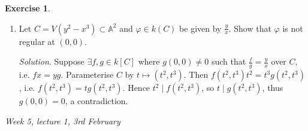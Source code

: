 \documentclass{article}
\newcommand{\A}{\mathbb{A}}
\theoremstyle{definition}
\newtheorem{exe}[defn]{Exercise}
\begin{document}
\begin{exe}
\begin{enumerate}
\textit{Solution}. \begin{enumerate}
\item $V=V(x)\cup V(y)$ and $W=V(y)\cup V(y-x^2)$. One is two axes and the other is $x$-axis with the parabola $y=x^2$, so both are two lines with an intersection at $(0,0)$, hence intuitively they should be isomorphic?
\item $(0,0)$.
\item $W$ is affine, so $f$ is regular if $\exists F\in k[x,y]:F(x,y)=f(x,y) \ \forall (x,y)\in W$. In particular, $y\neq 0$ means $(x,y)\in V(y-x^2)$, so we want $F(x,0)=x^2$ and $F(x,x^2)=0$. Clearly $F(x,y)=x^2-y$ works.
\item By the same analysis, we want $F\in k[x,y]$ with $F(x,0)=x,\ F(x,x^2)=0$. Then write $F(x,y)=x+yG(x,y)$, so $F(x,x^2)=x+x^2G(x,y)=0$, which is impossible.
\item By (a), we can try to fix $V(y)$ and send $V(x)$ to $V(y-x^2)$, i.e. $(x,0)\mapsto (x,0)$ and $(0,y)\mapsto(y,y^2)$. This can be done by simply adding them together: define $f:V\rightarrow W$ via $(x,y)\mapsto (x+y,y^2)$.
\item No. Suppose per contra $\psi:W\rightarrow V$ is an isomorphism. Since $V(x),V(y)$ are symmetric components of $V$ and $\psi$ maps irreducible components to irreducible components, WLOG one has $\psi$ gives isomorphisms $V(y)\cong V(y)$ and $V(y-x^2)\cong V(x)$, and $\psi(0,0)=(0,0)$. Write $\psi(x,y)=(g(x,y),h(x,y))$. Since $V(y)\cong\A^1$, by a previous exercise (\ref{allA1iso}), we have $g(x,y)=\lambda x$ for some $\lambda\in k^\times$, and for $y\neq 0$, $(x,y)\in V(y-x^2)$, so $\psi(x,y)\in V(x)$ and $g(x,y)$. This contradicts (d).
\end{enumerate}
\item Let $C=V(y^2-x^3)\subset\A^2$ and $\varphi\in k(C)$ be given by $\frac{y}{x}$. Show that $\varphi$ is not regular at $(0,0)$.

\textit{Solution}. Suppose $\exists f,g\in k[C]$ where $g(0,0)\neq 0$ such that $\frac{f}{g}=\frac{y}{x}$ over $C$, i.e. $fx=yg$. Parameterise $C$ by $t\mapsto (t^2,t^3)$. Then $f(t^2,t^3)t^2=t^3g(t^2,t^3)$, i.e. $f(t^2,t^3)=tg(t^2,t^3)$. Hence $t^2\mid f(t^2,t^3)$, so $t\mid g(t^2,t^3)$, thus $g(0,0)=0$, a contradiction.
\end{enumerate}
\end{exe}

\begin{flushright}
\textit{Week 5, lecture 1, 3rd February}
\end{flushright}
\end{document}
